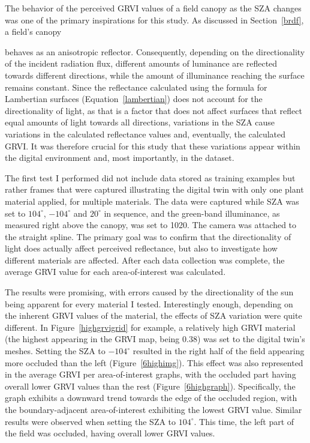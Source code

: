 The behavior of the perceived GRVI values of a field canopy as the SZA changes was one of the primary inspirations for this study. As discussed in Section~\ref{brdf}, a field's canopy





\noindent behaves as an anisotropic reflector. Consequently, depending on the directionality of the incident radiation flux, different amounts of luminance are reflected towards different directions, while the amount of illuminance reaching the surface remains constant. Since the reflectance calculated using the formula for Lambertian surfaces (Equation~\ref{lambertian}) does not account for the directionality of light, as that is a factor that does not affect surfaces that reflect equal amounts of light towards all directions, variations in the SZA cause variations in the calculated reflectance values and, eventually, the calculated GRVI. It was therefore crucial for this study that these variations appear within the digital environment and, most importantly, in the dataset. 

The first test I performed did not include data stored as training examples but rather frames that were captured illustrating the digital twin with only one plant material applied, for multiple materials. The data were captured while SZA was set to $104^\circ$, $-104^\circ$ and $20^\circ$ in sequence, and the green-band illuminance, as measured right above the canopy, was set to 1020. The camera was attached to the straight spline. The primary goal was to confirm that the directionality of light does actually affect perceived reflectance, but also to investigate how different materials are affected. After each data collection was complete, the average GRVI value for each area-of-interest was calculated.

The results were promising, with errors caused by the directionality of the sun being apparent for every material I tested. Interestingly enough, depending on the inherent GRVI values of the material, the effects of SZA variation were quite different. In Figure~\ref{highgrvigrid} for example, a relatively high GRVI material (the highest appearing in the GRVI map, being 0.38) was set to the digital twin's meshes. Setting the SZA to $-104^\circ$ resulted in the right half of the field appearing more occluded than the left (Figure~\ref{6highimg}). This effect was also represented in the average GRVI per area-of-interest graphs, with the occluded part having overall lower GRVI values than the rest (Figure~\ref{6highgraph}). Specifically, the graph exhibits a downward trend towards the edge of the occluded region, with the boundary-adjacent area-of-interest exhibiting the lowest GRVI value. Similar results were observed when setting the SZA to $104^\circ$. This time, the left part of the field was occluded, having overall lower GRVI values. 

